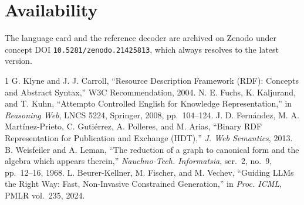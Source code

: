 \documentclass[conference]{IEEEtran}
\begin{document}
\section*{Availability}
The language card and the reference decoder are archived on Zenodo under concept
DOI \texttt{10.5281/zenodo.21425813}, which always resolves to the latest version.

\begin{thebibliography}{1}
 G. Klyne and J. J. Carroll, ``Resource Description Framework (RDF):
Concepts and Abstract Syntax,'' W3C Recommendation, 2004.
 N. E. Fuchs, K. Kaljurand, and T. Kuhn, ``Attempto Controlled
English for Knowledge Representation,'' in \emph{Reasoning Web}, LNCS 5224,
Springer, 2008, pp.\ 104--124.
 J. D. Fern\'andez, M. A. Mart\'inez-Prieto, C. Guti\'errez,
A. Polleres, and M. Arias, ``Binary RDF Representation for Publication and
Exchange (HDT),'' \emph{J. Web Semantics}, 2013.
 B. Weisfeiler and A. Leman, ``The reduction of a graph to canonical
form and the algebra which appears therein,'' \emph{Nauchno-Tech. Informatsia},
ser.\ 2, no.\ 9, pp.\ 12--16, 1968.
 L. Beurer-Kellner, M. Fischer, and M. Vechev, ``Guiding LLMs the
Right Way: Fast, Non-Invasive Constrained Generation,'' in \emph{Proc. ICML},
PMLR vol.\ 235, 2024.
\end{thebibliography}
\end{document}

